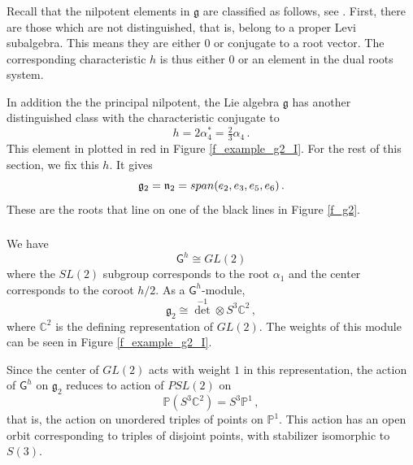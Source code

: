 \documentclass[14pt]{extarticle}
\newcommand{\C}{\mathbb{C}}
\newcommand{\bA}{\mathsf{A}}
\newcommand{\bG}{\mathsf{G}}
\newcommand{\bP}{\mathbb{P}}
\newcommand{\fg}{\mathfrak{g}}
\newcommand{\fn}{\mathfrak{n}}
\theoremstyle{definition}
\begin{document}
\subsubsection{} 

  
Recall that the nilpotent elements in $\fg$ are classified as
follows, see \cite{Coll}. First, there are those which are not
distinguished, that is, belong to a proper Levi subalgebra. This means
they are either 0 or conjugate to a root vector. The corresponding
characteristic $h$ is thus either 0 or an element in the dual roots
system.

In addition the the principal nilpotent, the Lie algebra $\fg$ has
another distinguished class with the characteristic conjugate to
%
\begin{equation}
  \label{h_dist}
  h= 2 \alpha_4^* = \tfrac{2}{3} \alpha_4 \,. 
  \end{equation}
%
  This element in plotted in red in Figure \ref{f_example_g2_I}.
  For the rest of this section, we fix this $h$. It gives 
  \[
    \fg_2 = \fn_2 = \textup{span}(e_2,e_3,e_5,e_6)\,.
  \]
These are the roots that line on one of the black lines in Figure
\ref{f_g2}.

\subsubsection{}



We have
\[
  \bG^h \cong GL(2)
\]
where the $SL(2)$ subgroup corresponds to the root $\alpha_1$ and the
center corresponds to the coroot $h/2$.
%
%
As a $\bG^h$-module, 
\[
  \fg_2  \cong {\det}^{-1} \otimes S^3 \C^2 \,, 
  \]
  where $\C^2$ is the defining representation of $GL(2)$. The
  weights of this module can be seen in Figure \ref{f_example_g2_I}. 

  Since the center of
  $GL(2)$ acts with weight $1$ in this representation, 
  the action of $\bG^h$ on $ \fg_2$ reduces
  to action of $PSL(2)$ on
  \[
    \bP\left(  S^3 \C^2 \right) = S^3 \bP^1 \,,
  \]
  that is, the action on unordered triples of points on $\bP^1$. This
  action has an open orbit corresponding to triples of disjoint
  points, with stabilizer isomorphic to $S(3)$.
  
\end{document}

